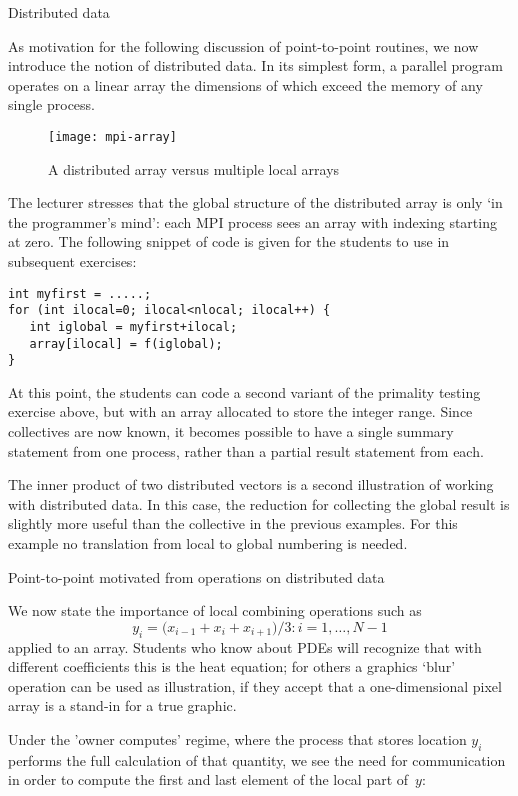  {Distributed data}

As motivation for the following discussion of point-to-point routines,
we now introduce the notion of distributed data. In its simplest form,
a parallel program operates on a linear array the dimensions of which
exceed the memory of any single process.

\begin{figure*}[ht]
  \texttt{[image: mpi-array]}
  \caption{A distributed array versus multiple local arrays}
  \label{fig:mental-array}
\end{figure*}

The lecturer stresses that the global structure of the distributed
array is only `in the programmer's mind': each MPI process sees an array
with indexing starting at zero. The following snippet of code is given
for the students to use in subsequent exercises:
{\small
\begin{verbatim}
int myfirst = .....;
for (int ilocal=0; ilocal<nlocal; ilocal++) {
   int iglobal = myfirst+ilocal;
   array[ilocal] = f(iglobal);
}  
\end{verbatim}
}

At this point, the students can code a second variant of the primality testing
exercise above, but with an array allocated to store the integer range.
Since collectives are now known, it becomes possible to have a single summary
statement from one process, rather than a partial result statement from each.

The inner product of two distributed vectors is a second illustration
of working with distributed data. In this case, the reduction for
collecting the global result is slightly more useful than the collective
in the previous examples. For this example no translation from local to global
numbering is needed.

 {Point-to-point motivated from operations on distributed data}

We now state the importance of local combining operations such as
\[ y_i=\bigl( x_{i-1}+x_i+x_{i+1} \bigr)/3\colon i=1,\ldots,N-1 \]
applied to an array. Students who know about \acp{PDE} will recognize
that with different coefficients this is
the heat equation; for others a graphics `blur' operation can be used
as illustration, if they accept that a one-dimensional pixel array is
a stand-in for a true graphic.

Under the 'owner computes' regime, where the process that stores location $y_i$ performs
the full calculation of that quantity, we see the need for communication
in order to compute the first and last element of the local part of~$y$:

